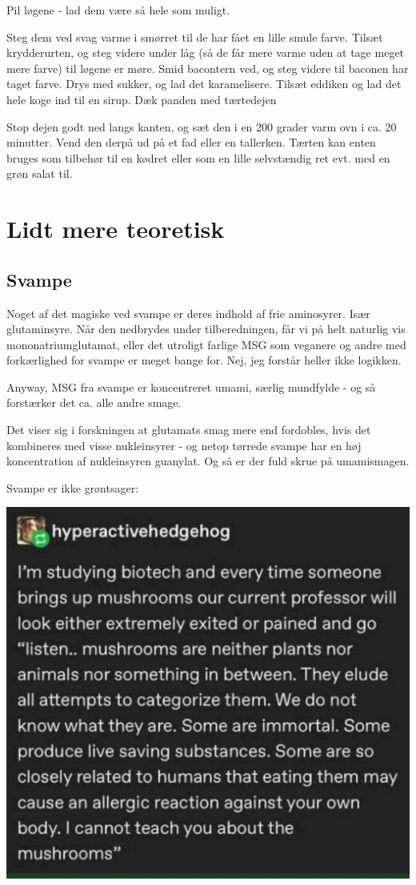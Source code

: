 \documentclass[
]{book}
\begin{document}
Pil løgene - lad dem være så hele som muligt.

Steg dem ved svag varme i smørret til de har fået en lille smule farve. Tilsæt krydderurten, og steg videre under låg (så de får mere varme uden at tage meget mere farve) til løgene er møre. Smid bacontern ved, og steg videre til baconen har taget farve. Drys med sukker, og lad det karamelisere. Tilsæt eddiken og lad det hele koge ind til en sirup. Dæk panden med tærtedejen

Stop dejen godt ned langs kanten, og sæt den i en 200 grader varm ovn i ca. 20 minutter. Vend den derpå ud på et fad eller en tallerken. Tærten kan enten bruges som tilbehør til en kødret eller som en lille selvstændig ret evt. med en grøn salat til.

\chapter{Lidt mere teoretisk}\label{lidt-mere-teoretisk}

\section{Svampe}\label{svampe}

Noget af det magiske ved svampe er deres indhold af frie aminosyrer. Især
glutaminsyre. Når den nedbrydes under tilberedningen, får vi på helt naturlig
vis mononatriumglutamat, eller det utroligt farlige MSG som veganere og andre
med forkærlighed for svampe er meget bange for. Nej, jeg forstår heller ikke
logikken.

Anyway, MSG fra svampe er koncentreret umami, særlig mundfylde - og så forstærker
det ca. alle andre smage.

Det viser sig i forskningen at glutamats smag mere end fordobles, hvis det kombineres
med visse nukleinsyrer - og netop tørrede svampe har en høj koncentration af
nukleinsyren guanylat. Og så er der fuld skrue på umamismagen.

Svampe er ikke grøntsager:

\includegraphics{images/svampe.png}
\end{document}
